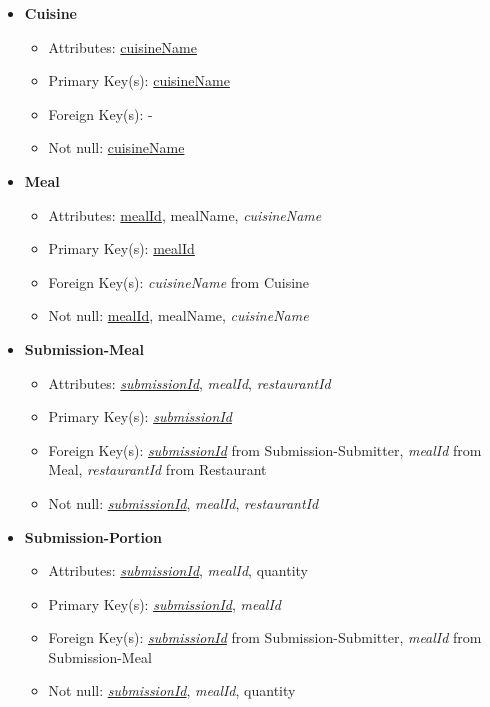 \documentclass{article}
\begin{document}
\begin{itemize}
        \item \textbf{Cuisine}
        \begin{itemize}
            \item Attributes: \underline{cuisineName}
            \item Primary Key(s): \underline{cuisineName}
            \item Foreign Key(s): -
            \item Not null: \underline{cuisineName}
        \end{itemize}
        
        \item \textbf{Meal}
        \begin{itemize}
            \item Attributes: \underline{mealId}, mealName, \textit{cuisineName}
            \item Primary Key(s): \underline{mealId}
            \item Foreign Key(s): \textit{cuisineName} from Cuisine
            \item Not null: \underline{mealId}, mealName, \textit{cuisineName}
        \end{itemize}

        \item \textbf{Submission-Meal}
        \begin{itemize}
            \item Attributes: \underline{\textit{submissionId}}, \textit{mealId}, \textit{restaurantId}
            \item Primary Key(s): \underline{\textit{submissionId}}
            \item Foreign Key(s): \underline{\textit{submissionId}} from Submission-Submitter, \textit{mealId} from Meal, \textit{restaurantId} from Restaurant          
            \item Not null: \underline{\textit{submissionId}}, \textit{mealId}, \textit{restaurantId}
        \end{itemize}

        \item \textbf{Submission-Portion}
        \begin{itemize}
            \item Attributes: \underline{\textit{submissionId}}, \textit{mealId}, quantity
            \item Primary Key(s): \underline{\textit{submissionId}}, \textit{mealId}
            \item Foreign Key(s): \underline{\textit{submissionId}} from Submission-Submitter, \textit{mealId} from Submission-Meal
            \item Not null: \underline{\textit{submissionId}}, \textit{mealId}, quantity
        \end{itemize}


\end{itemize}
\end{document}
